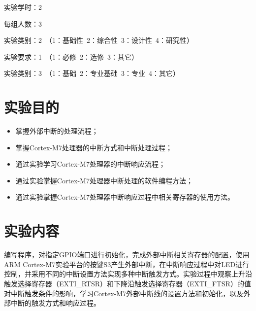 ﻿\documentclass[UTF8,12pt]{article}
\newcommand\myemptypage{
    \null
    \thispagestyle{empty}
    \addtocounter{page}{-1}
    \newpage
}
\begin{document}
\begin{titlepage}
    
\end{titlepage}

\myemptypage

\begin{center}
    \tableofcontents
\end{center}

\newpage


实验学时：2

每组人数：3

实验类别：2\ （1：基础性\ 2：综合性\ 3：设计性\ 4：研究性）

实验要求：1\ （1：必修\ 2：选修\ 3：其它）

实验类别：3\ （1：基础\ 2：专业基础\ 3：专业\ 4：其它）

\section{实验目的}
\begin{itemize}
  \item 掌握外部中断的处理流程；
  \item 掌握Cortex-M7处理器的中断方式和中断处理过程；
  \item 通过实验学习Cortex-M7处理器的中断响应流程；
  \item 通过实验掌握Cortex-M7处理器中断处理的软件编程方法；
  \item 通过实验掌握Cortex-M7处理器中断响应过程中相关寄存器的使用方法。
\end{itemize}

\section{实验内容}
编写程序，对指定GPIO端口进行初始化，完成外部中断相关寄存器的配置，使用ARM Cortex-M7实验平台的按键S3产生外部中断，在中断响应过程中对LED进行控制，并采用不同的中断设置方法实现多种中断触发方式。实验过程中观察上升沿触发选择寄存器（EXTI\_RTSR）和下降沿触发选择寄存器（EXTI\_FTSR）的值对中断触发条件的影响，学习Cortex-M7外部中断线的设置方法和初始化，以及外部中断的触发方式和响应过程。
\end{document}
